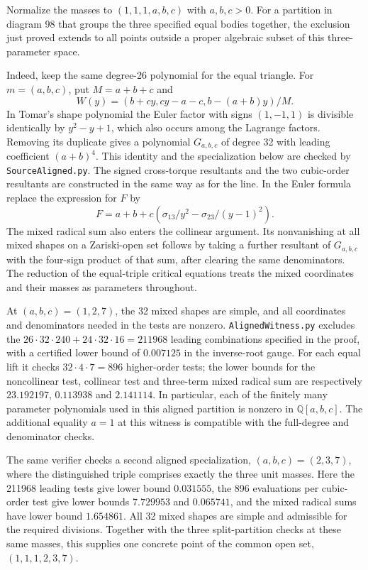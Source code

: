 \documentclass[11pt]{article}
\begin{document}
Normalize the masses to \((1,1,1,a,b,c)\) with \(a,b,c>0\).
For a partition in diagram 98 that groups the three specified equal bodies
together, the exclusion just proved extends to all points outside a
proper algebraic subset of this three-parameter space.

Indeed, keep the same degree-26 polynomial for the equal triangle. For
\(m=(a,b,c)\), put \(M=a+b+c\) and
\[
 W(y)=(b+cy,cy-a-c,b-(a+b)y)/M.
\]
In Tomar's shape polynomial the Euler factor with signs \((1,-1,1)\)
is divisible identically by \(y^2-y+1\), which also occurs among the
Lagrange factors. Removing its duplicate gives a polynomial \(G_{a,b,c}\)
of degree 32 with leading coefficient \((a+b)^4\). This identity and
the specialization below are checked by \texttt{SourceAligned.py}.
The signed cross-torque resultants and the two cubic-order resultants
are constructed in the same way as for the line. In the Euler formula
replace the expression for \(F\) by
\[
 F=a+b+c\left(\sigma_{13}/y^2-\sigma_{23}/(y-1)^2\right).
\]
The mixed radical sum also enters the collinear argument. Its nonvanishing
at all mixed shapes on a Zariski-open set follows by taking a further
resultant of \(G_{a,b,c}\) with the four-sign product of that sum,
after clearing the same denominators. The reduction of the equal-triple
critical equations treats the mixed coordinates and their masses as
parameters throughout.

At \((a,b,c)=(1,2,7)\), the 32 mixed shapes are simple, and all
coordinates and denominators needed in the tests are nonzero.
\texttt{AlignedWitness.py} excludes the
\(26\cdot32\cdot240+24\cdot32\cdot16=211968\) leading combinations
specified in the proof, with a certified lower bound of \(0.007125\)
in the inverse-root gauge. For each equal lift it checks
\(32\cdot4\cdot7=896\) higher-order tests; the lower bounds for the
noncollinear test, collinear test and three-term mixed radical sum are
respectively \(23.192197\), \(0.113938\) and \(2.141114\).
In particular, each of the finitely many parameter polynomials used
in this aligned partition is nonzero in \(\mathbb Q[a,b,c]\).
The additional equality \(a=1\) at this witness is compatible with
the full-degree and denominator checks.

The same verifier checks a second aligned specialization, \((a,b,c)=(2,3,7)\),
where the distinguished triple comprises exactly the three unit masses.
Here the 211968 leading tests give lower bound \(0.031555\),
the 896 evaluations per cubic-order test give lower bounds \(7.729953\)
and \(0.065741\), and the mixed radical sums have lower bound
\(1.654861\). All 32 mixed shapes are simple and admissible for the
required divisions. Together with the three split-partition
checks at these same masses, this supplies one concrete point of the
common open set, \((1,1,1,2,3,7)\).
\end{document}
